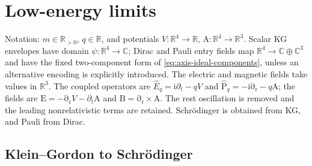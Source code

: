 \documentclass[11pt]{article}
\newcommand{\vstyle}[1]{{\bm{\mathrm{#1}}}}
\numberwithin{equation}{section}
\newcommand{\R}{\mathbb{R}}
\newcommand{\C}{\mathbb{C}}
\newcommand{\ii}{\mathrm{i}}
\newcommand{\bA}{\vstyle{A}}
\newcommand{\br}{\vstyle{r}}
\newcommand{\bE}{\vstyle{E}}
\newcommand{\bBf}{\vstyle{B}}
\newcommand{\bp}{\vstyle{P}}
\newcommand{\hEq}{\hat E_q}
\newcommand{\hbpq}{\hat{\bp}_q}
\newcommand{\pdr}{\vstyle{\partial}_{\br}}
\begin{document}
\section{Low-energy limits}
\label{sec:low-energy-limits}

Notation: $m\in\R_{>0}$, $q\in\R$, and potentials
$V:\R^4\to\R$, $\bA:\R^4\to\R^3$.
Scalar KG envelopes have domain $\psi:\R^4\to\C$;
Dirac and Pauli entry fields map $\R^4\to\C\oplus\C^3$ and have the fixed
two-component form of \eqref{eq:axis-ideal-components}, unless an
alternative encoding is explicitly introduced. The electric and magnetic
fields take values in $\R^3$.
The coupled operators are $\hEq=\ii\partial_t-qV$ and
$\hbpq=-\ii\pdr-q\bA$; the fields are
$\bE=-\pdr V-\partial_t\bA$ and $\bBf=\pdr\times\bA$.
The rest oscillation is removed and the leading nonrelativistic terms are retained.
Schr\"odinger is obtained from KG, and Pauli from Dirac.

\subsection{Klein--Gordon to Schr\"odinger}
\label{sec:schrodinger-limit}
\end{document}
